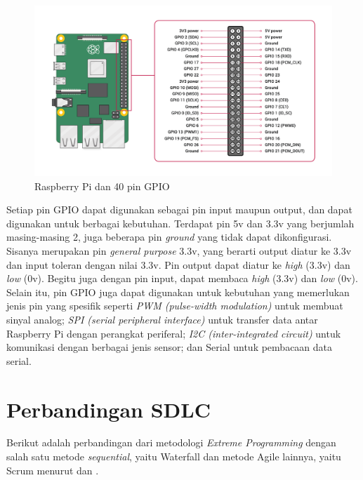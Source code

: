 \begin{figure}[!h]
    \includegraphics[width=1\linewidth, center]{images/tinjauan-pustaka/fig-raspy.png}
    \caption{Raspberry Pi dan 40 pin GPIO}
    \label{fig:raspy}
\end{figure}

Setiap pin GPIO dapat digunakan sebagai pin input maupun output, dan dapat digunakan untuk berbagai kebutuhan. Terdapat pin 5v dan 3.3v yang berjumlah masing-masing 2, juga beberapa pin \textit{ground} yang tidak dapat dikonfigurasi. Sisanya merupakan pin \textit{general purpose} 3.3v, yang berarti  output diatur ke 3.3v dan input toleran dengan nilai 3.3v. Pin output dapat diatur ke \textit{high} (3.3v) dan \textit{low} (0v). Begitu juga dengan pin input, dapat membaca \textit{high} (3.3v) dan \textit{low} (0v). Selain itu, pin GPIO juga dapat digunakan untuk kebutuhan yang memerlukan jenis pin yang spesifik seperti \textit{PWM (pulse-width modulation)} untuk membuat sinyal analog; \textit{SPI (serial peripheral interface)} untuk transfer data antar Raspberry Pi dengan perangkat periferal; \textit{I2C (inter-integrated circuit)} untuk komunikasi dengan berbagai jenis sensor; dan Serial untuk pembacaan data serial.

\section{Perbandingan SDLC}

\noindent Berikut adalah perbandingan dari metodologi \textit{Extreme Programming} dengan salah satu metode \textit{sequential}, yaitu Waterfall dan metode Agile lainnya, yaitu Scrum menurut \textcite{inproc:fahrurrozi} dan \textcite{article:suryantara}.

\newpage

